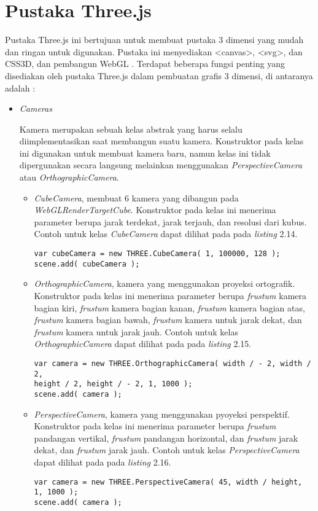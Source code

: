 \section{Pustaka Three.js}
\label{sec:latex}
Pustaka Three.js ini bertujuan untuk membuat pustaka 3 dimensi yang mudah dan ringan untuk digunakan. Pustaka ini menyediakan <canvas>, <svg>, dan CSS3D, dan pembangun WebGL \cite{githubthreejs}.
Terdapat beberapa fungsi penting yang disediakan oleh pustaka Three.js dalam pembuatan grafis 3 dimensi, di antaranya adalah \cite{threejs}:
\begin{itemize}

\item \textit{Cameras}

	Kamera merupakan sebuah kelas abstrak yang harus selalu diimplementasikan saat membangun suatu kamera. Konstruktor pada kelas ini digunakan untuk membuat kamera baru, namun kelas ini tidak dipergunakan secara langsung melainkan menggunakan {\it PerspectiveCamera} atau {\it OrthographicCamera}.
	\begin{itemize}
	\item {\it CubeCamera}, membuat 6 kamera yang dibangun pada {\it WebGLRenderTargetCube}. Konstruktor pada kelas ini menerima parameter berupa jarak terdekat, jarak terjauh, dan resolusi dari kubus. Contoh untuk kelas {\it CubeCamera} dapat dilihat pada pada {\it listing} 2.14.
	\begin{lstlisting}[caption={Contoh instansiasi kelas {\it CubeCamera}.},captionpos=b]
var cubeCamera = new THREE.CubeCamera( 1, 100000, 128 );
scene.add( cubeCamera );
\end{lstlisting}
	
	\item{\it OrthographicCamera}, kamera yang menggunakan proyeksi ortografik. Konstruktor pada kelas ini menerima parameter berupa {\it frustum} kamera bagian kiri, {\it frustum} kamera bagian kanan, {\it frustum} kamera bagian atas, {\it frustum} kamera bagian bawah, {\it frustum} kamera untuk jarak dekat, dan {\it frustum} kamera untuk jarak jauh. Contoh untuk kelas {\it OrthographicCamera} dapat dilihat pada pada {\it listing} 2.15.
\begin{lstlisting}[caption={Contoh instansiasi kelas {\it OrthographicCamera}},captionpos=b]
var camera = new THREE.OrthographicCamera( width / - 2, width / 2, 
height / 2, height / - 2, 1, 1000 );
scene.add( camera );
\end{lstlisting}
	
	\item {\it PerspectiveCamera}, kamera yang menggunakan pyoyeksi perspektif. Konstruktor pada kelas ini menerima parameter berupa {\it frustum} pandangan vertikal, {\it frustum} pandangan horizontal, dan {\it frustum} jarak dekat, dan {\it frustum} jarak jauh. Contoh untuk kelas {\it PerspectiveCamera} dapat dilihat pada pada {\it listing} 2.16.
\begin{lstlisting}[caption={Contoh instansiasi kelas {\it PerspectiveCamera}},captionpos=b]
var camera = new THREE.PerspectiveCamera( 45, width / height, 
1, 1000 );
scene.add( camera );
\end{lstlisting}
	

\end{itemize}
\end{itemize}
